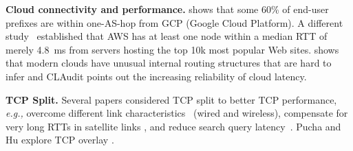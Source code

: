 \documentclass[sigconf,usenames,dvipsnames,geometry]{acmart}
\newcommand{\mycomm}[3]{{\color{#2} \textbf{[#1: #3]}}}
\newcommand{\mycomm}[3]{}
\newcommand{\IK}[1]{\mycomm{IK}{blue}{#1}}
\providecommand{\eg}{\emph{e.g.,} }
\newcommand{\T}[1]{\smallskip\noindent\textbf{#1}} %
\begin{document}
\T{Cloud connectivity and performance.} \cite{one-hop} shows that some 60\% of end-user prefixes are within one-AS-hop from GCP (Google Cloud Platform). A different study~\cite{cgn2017} established that AWS has at least one node within a median RTT of merely 4.8~ms from servers hosting the top 10k most popular Web sites. \cite{unusual} shows that modern clouds have unusual internal routing structures that are hard to infer and CLAudit \cite{multidimensional} points out the increasing reliability of cloud latency. 

\T{TCP Split.} Several papers considered TCP split to better TCP performance, \eg overcome different link characteristics~ \cite{Kopparty2002} (wired and wireless), compensate for very long RTTs in satellite links \cite{luglio2004}, and reduce search query latency~\cite{pathak2010measuring}. 
Pucha and Hu explore TCP overlay \cite{pucha2005overlay, pucha2005slot}. 


\end{document}
